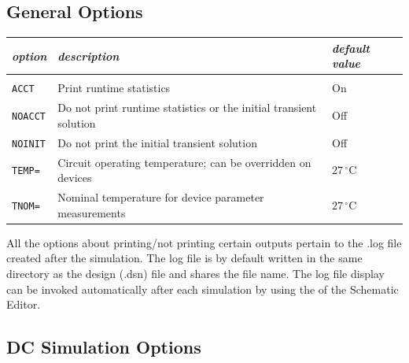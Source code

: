 \subsection{General Options}
\label{subsec_satco_generaloptions}

\begin{tabular}{lp{8cm}p{2cm}}
\textit{option} & \textit{description} & \textit{default value}\\ \hline \\ \vspace{-0.8\parskip}
\texttt{ACCT} & Print runtime statistics & On \\
\texttt{NOACCT} & Do not print runtime statistics or the initial transient solution & Off \\
\texttt{NOINIT} & Do not print the initial transient solution & Off \\
\texttt{TEMP=} & Circuit operating temperature; can be overridden on devices & $27\,^{\circ}\mathrm{C}$ \\
\texttt{TNOM=} & Nominal temperature for device parameter measurements & $27\,^{\circ}\mathrm{C}$
\end{tabular}

All the options about printing/not printing certain outputs pertain to the \textsf{.log} file created after the simulation.  The log file is by default written in the same directory as the design (\textsf{.dsn}) file and shares the file name.  The log file display can be invoked automatically after each simulation by using the  of the Schematic Editor.

\subsection{DC Simulation Options}
\label{subsec_satco_dcoptions}

